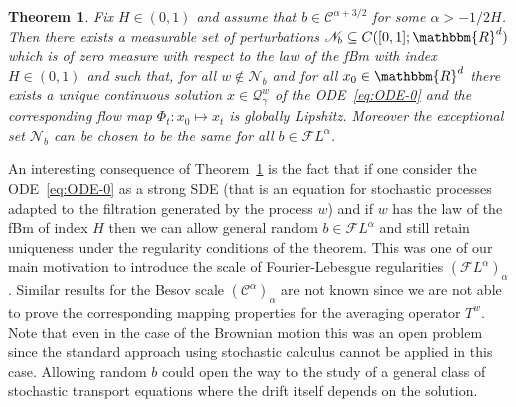 \documentclass[a4paper,11pt]{article}
\newtheorem{theorem}{Theorem}[section]
\newcommand{\CC}{\mathscr C}
\newcommand{\CF}{\mathscr F}
\newcommand{\CQ}{\mathscr Q}
\newcommand{\CN}{\mathscr N}
\begin{document}
\begin{theorem}
  \label{th:flow-H}Fix $H \in ( 0,1 )$ and assume that $b \in \CC^{\alpha
  +3/2}$ for some $\alpha >-1/2H$. Then there exists a measurable set of
  perturbations $\CN_{b} \subseteq C ( [ 0,1 ] ;\mathbbm{R}^{d} )$
  which is of zero measure with respect to the law of the fBm with index $H
  \in ( 0,1 )$ and such that, for all $w \notin \CN_{b}$ and for
  all $x_{0} \in \mathbbm{R}^{d}$ there exists a unique continuous solution $x
  \in \CQ^{w}_{\gamma}$ of the ODE~{\eqref{eq:ODE-0}} and the
  corresponding flow map $\Phi_{t} :x_{0} \mapsto x_{t}$ is globally Lipshitz.
  Moreover the exceptional set $\CN_{b}$ can be chosen to be the same
  for all $b \in \CF L^{\alpha}$. 
\end{theorem}

An interesting consequence of Theorem~\ref{th:flow-H} is the fact that if one
consider the ODE~{\eqref{eq:ODE-0}} as a strong SDE (that is an equation for
stochastic processes adapted to the filtration generated by the process $w$)
and if $w$ has the law of the fBm of index $H$ then we can allow general
random $b \in \CF L^{\alpha}$ and still retain uniqueness under the regularity
conditions of the theorem. This was one of our main motivation to introduce
the scale of Fourier-Lebesgue regularities $\left( \CF L^{\alpha}
\right)_{\alpha}$. Similar results for the Besov scale $\left( \CC^{\alpha}
\right)_{\alpha}$ are not known since we are not able to prove the
corresponding mapping properties for the averaging operator $T^{w}$. Note that
even in the case of the Brownian motion this was an open problem~{\cite{FGP}}
since the standard approach using stochastic calculus cannot be applied in
this case. Allowing random $b$ could open the way to the study of a general
class of stochastic transport equations where the drift itself depends on the
solution.
\end{document}
